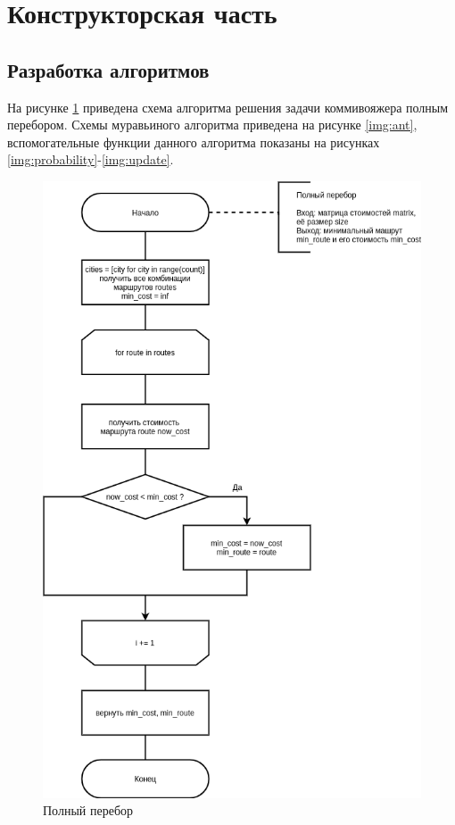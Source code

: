 \section{Конструкторская часть}

\subsection*{Разработка алгоритмов}
На рисунке \ref{img:brute} приведена схема алгоритма решения задачи коммивояжера полным перебором. Схемы муравьиного алгоритма приведена на рисунке \ref{img:ant}, вспомогательные функции данного алгоритма показаны на рисунках \ref{img:probability}-\ref{img:update}.

\begin{figure}[hbtp]
	\centering
	\includegraphics[scale=0.5]{images/brute.png}
	\caption{Полный перебор}
	\label{img:brute}
\end{figure}

